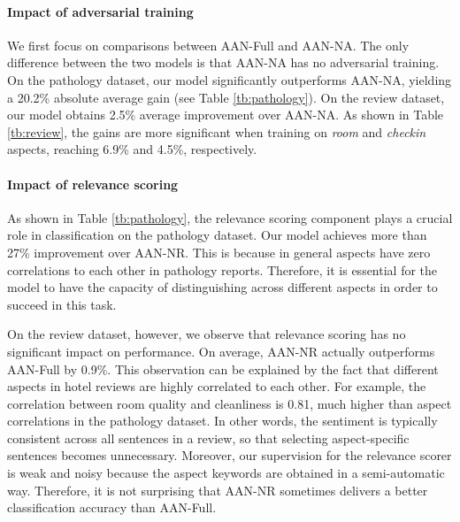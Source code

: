 \paragraph{Impact of adversarial training} We first focus on comparisons between AAN-Full and AAN-NA. The only difference between the two models is that AAN-NA has no adversarial training. On the pathology dataset, our model significantly outperforms AAN-NA, yielding a 20.2\% absolute average gain (see Table \ref{tb:pathology}). On the review dataset, our model obtains 2.5\% average improvement over AAN-NA. As shown in Table \ref{tb:review}, the gains are more significant when training on \emph{room} and \emph{checkin} aspects, reaching 6.9\% and 4.5\%, respectively. 

\paragraph{Impact of relevance scoring} As shown in Table \ref{tb:pathology}, the relevance scoring component plays a crucial role in classification on the pathology dataset. Our model achieves more than 27\% improvement over AAN-NR.
This is because in general aspects have zero correlations to each other in pathology reports. Therefore, it is essential for the model to have the capacity of distinguishing across different aspects in order to succeed in this task. 

On the review dataset, however, we observe that relevance scoring has no significant impact on performance. On average, AAN-NR actually outperforms AAN-Full by 0.9\%. This observation can be explained by the fact that different aspects in hotel reviews are highly correlated to each other. For example, the correlation between room quality and cleanliness is 0.81, much higher than aspect correlations in the pathology dataset. In other words, the sentiment is typically consistent across all sentences in a review, so that selecting aspect-specific sentences becomes unnecessary. Moreover, our supervision for the relevance scorer is weak and noisy because the aspect keywords are obtained in a semi-automatic way. Therefore, it is not surprising that AAN-NR sometimes delivers a better classification accuracy than AAN-Full.


